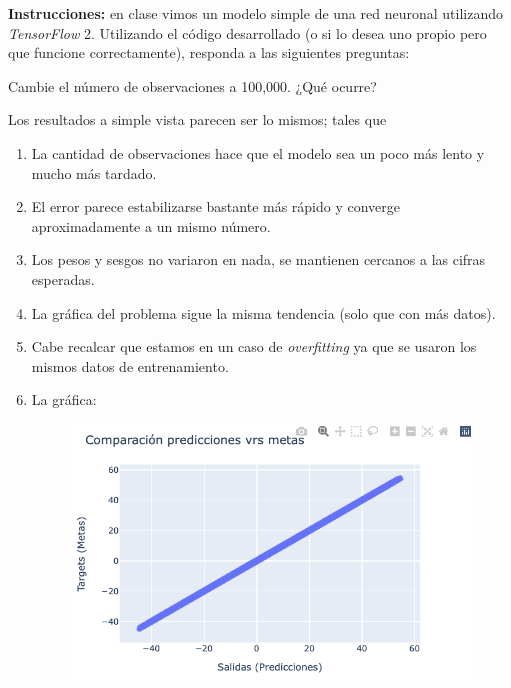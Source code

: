 





\textbf{Instrucciones: } en clase vimos un modelo simple de una red neuronal utilizando \textit{TensorFlow} 2. Utilizando el código desarrollado (o si lo desea uno propio pero que funcione correctamente), responda a las siguientes preguntas:

\begin{problema}
	Cambie el número de observaciones a 100,000. ¿Qué ocurre?
\end{problema}
\begin{sol}
	Los resultados a simple vista parecen ser lo mismos; tales que 
	\begin{enumerate}
		\item La cantidad de observaciones hace que el modelo sea un poco más lento y mucho más tardado.
		\item El error parece estabilizarse bastante más rápido y converge aproximadamente a un mismo número. 
		\item Los pesos y sesgos no variaron en nada, se mantienen cercanos a las cifras esperadas. 
		\item La gráfica del problema sigue la misma tendencia (solo que con más datos). 
		\item Cabe recalcar que estamos en un caso de \textit{overfitting} ya que se usaron los mismos datos de entrenamiento. 
		\item La gráfica: 
		\begin{figure}[H]
			\centering 
			\includegraphics[scale=0.4]{Images/1}
		\end{figure}
	\end{enumerate}
\end{sol}


